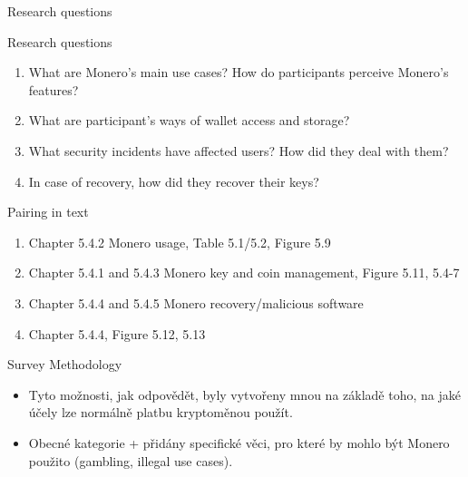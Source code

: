 \documentclass{beamer}
\begin{document}
\begin{darkframes}
    \begin{frame}{Research questions}
      \color{aquamarine}
      \color{white}
       \begin{multicols}{2}
       Research questions
      \begin{small}
      \begin{enumerate}
      \item What are Monero’s main use cases? How do participants
perceive Monero’s features?
      \item What are participant’s ways of wallet access and storage?
      \item What security incidents have affected users? How did they
deal with them?
      \item In case of recovery, how did they recover their keys?
      \end{enumerate}
      Pairing in text
      \begin{enumerate}
            \item Chapter 5.4.2 Monero usage, Table 5.1/5.2, Figure 5.9
      \item Chapter 5.4.1 and 5.4.3 Monero key and coin management, Figure 5.11, 5.4-7 
      \item Chapter 5.4.4 and 5.4.5 Monero recovery/malicious software
      \item Chapter 5.4.4, Figure 5.12, 5.13
      \end{enumerate}
      \end{small}
      \end{multicols}
    \end{frame}
    
        \begin{frame}{Survey Methodology}
     \color{aquamarine}
\begin{itemize}
\item Tyto možnosti, jak odpovědět, byly vytvořeny mnou na základě toho, na jaké účely lze normálně platbu kryptoměnou použít. 
\item Obecné kategorie + přidány specifické věci, pro které by mohlo být Monero použito (gambling, illegal use cases).
\end{itemize}
\end{frame}



    



  \end{darkframes}
\end{document}
